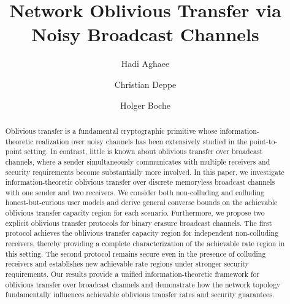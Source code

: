 \documentclass[runningheads]{llncs}
\newcounter{protocol}
\begin{document}
\title{Network Oblivious Transfer via Noisy Broadcast Channels}

\author{
Hadi Aghaee
\and Christian Deppe
\and Holger Boche
}


      
\maketitle

\begin{abstract}
Oblivious transfer is a fundamental cryptographic primitive whose information-theoretic realization over noisy channels has been extensively studied in the point-to-point setting. In contrast, little is known about oblivious transfer over broadcast channels, where a sender simultaneously communicates with multiple receivers and security requirements become substantially more involved. In this paper, we investigate information-theoretic oblivious transfer over discrete memoryless broadcast channels with one sender and two receivers. We consider both non-colluding and colluding honest-but-curious user models and derive general converse bounds on the achievable oblivious transfer capacity region for each scenario. Furthermore, we propose two explicit oblivious transfer protocols for binary erasure broadcast channels. The first protocol achieves the oblivious transfer capacity region for independent non-colluding receivers, thereby providing a complete characterization of the achievable rate region in this setting. The second protocol remains secure even in the presence of colluding receivers and establishes new achievable rate regions under stronger security requirements. Our results provide a unified information-theoretic framework for oblivious transfer over broadcast channels and demonstrate how the network topology fundamentally influences achievable oblivious transfer rates and security guarantees.
\end{abstract}

\end{document}
